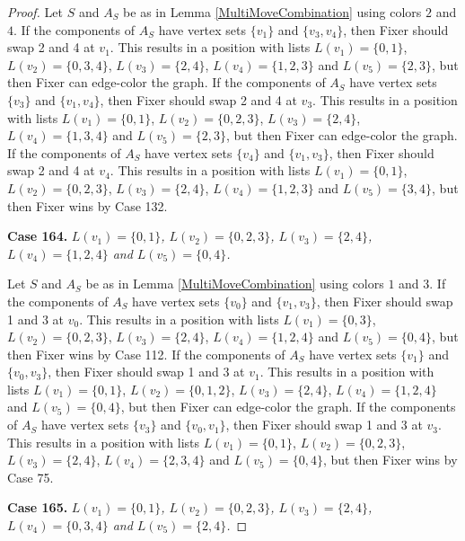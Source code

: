\documentclass[12pt]{amsart}
\theoremstyle{plain}
\theoremstyle{definition}
\theoremstyle{remark}
\begin{document}
\begin{proof}
Let $S$ and $A_S$ be as in Lemma \ref{MultiMoveCombination} using colors $2$ and $4$. If the components of $A_S$ have vertex sets $\{v_1\}$ and $\{v_3, v_4\}$, then Fixer should swap 2 and 4 at $v_1$. This results in a position with lists $L(v_1) = \{0, 1\}$, $L(v_2) = \{0, 3, 4\}$, $L(v_3) = \{2, 4\}$, $L(v_4) = \{1, 2, 3\}$ and $L(v_5) = \{2, 3\}$, but then Fixer can edge-color the graph.
If the components of $A_S$ have vertex sets $\{v_3\}$ and $\{v_1, v_4\}$, then Fixer should swap 2 and 4 at $v_3$. This results in a position with lists $L(v_1) = \{0, 1\}$, $L(v_2) = \{0, 2, 3\}$, $L(v_3) = \{2, 4\}$, $L(v_4) = \{1, 3, 4\}$ and $L(v_5) = \{2, 3\}$, but then Fixer can edge-color the graph.
If the components of $A_S$ have vertex sets $\{v_4\}$ and $\{v_1, v_3\}$, then Fixer should swap 2 and 4 at $v_4$. This results in a position with lists $L(v_1) = \{0, 1\}$, $L(v_2) = \{0, 2, 3\}$, $L(v_3) = \{2, 4\}$, $L(v_4) = \{1, 2, 3\}$ and $L(v_5) = \{3, 4\}$, but then Fixer wins by Case 132.

\noindent\textbf{Case 164.  }\textit{$L(v_1) = \{0, 1\}$, $L(v_2) = \{0, 2, 3\}$, $L(v_3) = \{2, 4\}$, $L(v_4) = \{1, 2, 4\}$ and $L(v_5) = \{0, 4\}$.}

Let $S$ and $A_S$ be as in Lemma \ref{MultiMoveCombination} using colors $1$ and $3$. If the components of $A_S$ have vertex sets $\{v_0\}$ and $\{v_1, v_3\}$, then Fixer should swap 1 and 3 at $v_0$. This results in a position with lists $L(v_1) = \{0, 3\}$, $L(v_2) = \{0, 2, 3\}$, $L(v_3) = \{2, 4\}$, $L(v_4) = \{1, 2, 4\}$ and $L(v_5) = \{0, 4\}$, but then Fixer wins by Case 112.
If the components of $A_S$ have vertex sets $\{v_1\}$ and $\{v_0, v_3\}$, then Fixer should swap 1 and 3 at $v_1$. This results in a position with lists $L(v_1) = \{0, 1\}$, $L(v_2) = \{0, 1, 2\}$, $L(v_3) = \{2, 4\}$, $L(v_4) = \{1, 2, 4\}$ and $L(v_5) = \{0, 4\}$, but then Fixer can edge-color the graph.
If the components of $A_S$ have vertex sets $\{v_3\}$ and $\{v_0, v_1\}$, then Fixer should swap 1 and 3 at $v_3$. This results in a position with lists $L(v_1) = \{0, 1\}$, $L(v_2) = \{0, 2, 3\}$, $L(v_3) = \{2, 4\}$, $L(v_4) = \{2, 3, 4\}$ and $L(v_5) = \{0, 4\}$, but then Fixer wins by Case 75.

\noindent\textbf{Case 165.  }\textit{$L(v_1) = \{0, 1\}$, $L(v_2) = \{0, 2, 3\}$, $L(v_3) = \{2, 4\}$, $L(v_4) = \{0, 3, 4\}$ and $L(v_5) = \{2, 4\}$.}


\end{proof}
\end{document}
